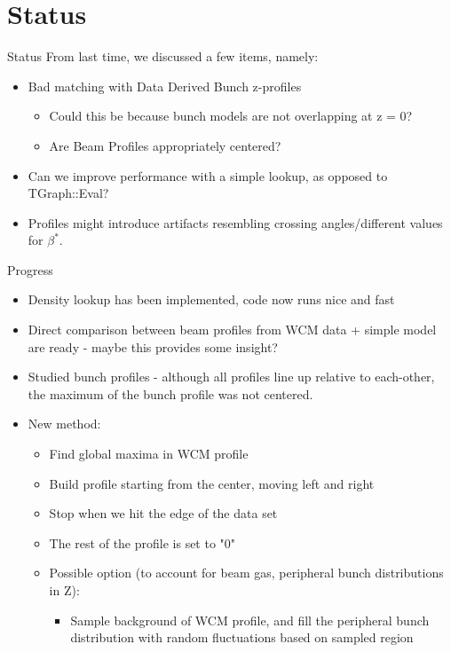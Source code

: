 \section{Status}
\label{ch:Status}

\begin{frame}{Status}
From last time, we discussed a few items, namely:

\begin{itemize}
	\item Bad matching with Data Derived Bunch z-profiles
		\begin{itemize}
			\item Could this be because bunch models are not overlapping at z = 0?
			\item Are Beam Profiles appropriately centered?
		\end{itemize}
	\item Can we improve performance with a simple lookup, as opposed to TGraph::Eval?
	\item Profiles might introduce artifacts resembling crossing angles/different
		values for $\beta^{*}$.
\end{itemize}

\end{frame}

\begin{frame}{Progress}
	\begin{itemize}
    \item Density lookup has been implemented, code now runs nice and fast
		\item Direct comparison between beam profiles from WCM data + simple model
			are ready - maybe this provides some insight?
		\item Studied bunch profiles - although all profiles line up relative to
			each-other, the maximum of the bunch profile was not centered.
		\item New method:
			\begin{itemize}
				\item Find global maxima in WCM profile
				\item Build profile starting from the center, moving left and right
				\item Stop when we hit the edge of the data set
				\item The rest of the profile is set to "0"
				\item Possible option (to account for beam gas, peripheral bunch
					distributions in Z):
					\begin{itemize}
						\item Sample background of WCM profile, and fill the peripheral bunch
							distribution with random fluctuations based on sampled region
					\end{itemize}
			\end{itemize}
	\end{itemize}
\end{frame}

